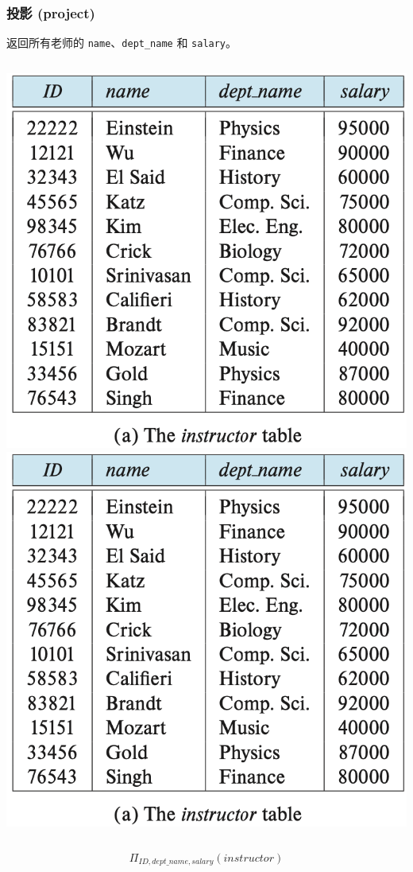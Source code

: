 \documentclass[aspectratio=169, 14pt]{beamer}
\begin{document}
\begin{frame}
	\frametitle{投影 (project)}
	返回所有老师的 \texttt{name}、\texttt{dept\_name} 和 \texttt{salary}。
	\begin{columns}
		\includegraphics[width=\textwidth, trim={0 4.4cm 0 0},clip]{table/instructor}
		\includegraphics[height=.4\paperheight, trim={2.8cm 4.4cm 0 0},clip]{table/instructor}
		\pause
	\end{columns}
	\large{\[\Pi_{ID, dept\_name, salary}(instructor)\]}
\end{frame}
\end{document}
